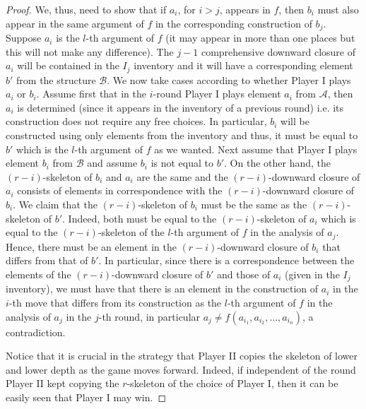 \documentclass[a4paper,11pt]{article}
\begin{document}
\begin{proof}
We, thus, need to show that if $a_i$, for $i>j$, appears in $f$, then $b_i$ must also appear in the same argument of $f$ in the corresponding construction of $b_j$. Suppose $a_i$ is the $l$-th argument of $f$ (it may appear in more than one places but this will not make any difference). The $j-1$ comprehensive downward closure of $a_i$ will be contained in the $I_j$ inventory and it will have a corresponding element $b'$ from the structure $\mathcal{B}$. We now take cases according to whether Player I plays $a_i$ or $b_i$. Assume first that in the $i$-round Player I plays element $a_i$ from $\mathcal{A}$, then $a_i$ is determined (since it appears in the inventory of a previous round) i.e. its construction does not require any free choices. In particular, $b_i$ will be constructed using only elements from the inventory and thus, it must be equal to $b'$ which is the $l$-th argument of $f$ as we wanted. Next assume that Player I plays element $b_i$ from $\mathcal{B}$ and assume $b_i$ is not equal to $b'$. On the other hand, the $(r-i)$-skeleton of $b_i$ and $a_i$ are the same and the $(r-i)$-downward closure of $a_i$ consists of elements in correspondence with the $(r-i)$-downward closure of $b_i$. We claim that  the $(r-i)$-skeleton of $b_i$ must be the same as the $(r-i)$-skeleton of $b'$. Indeed, both must be equal to the $(r-i)$-skeleton of $a_i$ which is equal to the $(r-i)$-skeleton of the $l$-th argument of $f$ in the analysis of $a_j$. Hence, there must be an element in the $(r-i)$-downward closure of $b_i$ that differs from that of $b'$. In particular, since there is a correspondence between the elements of the $(r-i)$-downward closure of $b'$ and those of $a_i$ (given in the $I_j$ inventory), we must have that there is an element in the construction of $a_i$ in the $i$-th move that differs from its construction as the $l$-th argument of $f$ in the analysis of $a_j$ in the $j$-th round, in particular $a_j\neq f(a_{i_1}, a_{i_2}, \ldots, a_{i_n})$, a contradiction.    
    
Notice that it is crucial in the strategy that Player II copies the skeleton of lower and lower depth as the game moves forward. Indeed, if independent of the round Player II kept copying the $r$-skeleton of the choice of Player I, then it can be easily seen that Player I may win.  


\end{proof}
\end{document}
